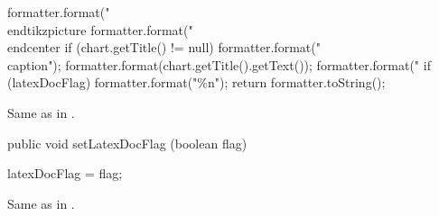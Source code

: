 \begin{code}
\begin{hide}
{      formatter.format("\\end{tikzpicture}%
      formatter.format("\\end{center}%
      if (chart.getTitle() != null) {
         formatter.format("\\caption{");
         formatter.format(chart.getTitle().getText());
         formatter.format("}%
      }
      if (latexDocFlag)
      formatter.format("\%n");
      return formatter.toString();
   }\end{hide}
\end{code}
\begin{tabb}
Same as in .
\end{tabb}
\begin{htmlonly}
\end{htmlonly}
\begin{code}

   public void setLatexDocFlag (boolean flag) \begin{hide} {
      latexDocFlag = flag;
   }\end{hide}
\end{code}
\begin{tabb}
Same as in .
\end{tabb}
